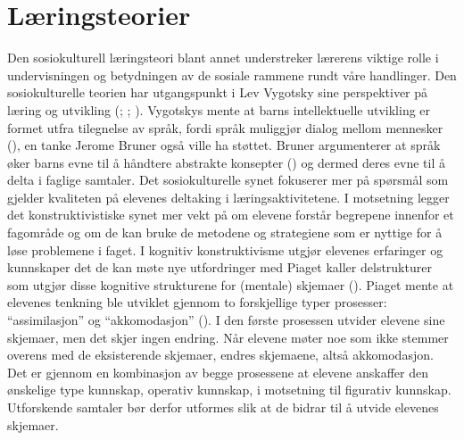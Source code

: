 \documentclass[12pt,twoside,onecolumn,norsk]{article}
\begin{document}
\section*{Læringsteorier}
Den sosiokulturell læringsteori blant annet understreker lærerens viktige 
rolle i undervisningen og betydningen av de sosiale rammene rundt våre 
handlinger. Den sosiokulturelle teorien har utgangspunkt i Lev Vygotsky 
sine perspektiver på læring og utvikling (; 
; ). Vygotskys
mente at barns intellektuelle utvikling er formet utfra tilegnelse av språk, 
fordi språk muliggjør dialog mellom mennesker (), 
en tanke Jerome Bruner også ville ha støttet. Bruner argumenterer at språk øker 
barns evne til å håndtere abstrakte konsepter () og dermed deres evne 
til å delta i faglige samtaler. Det sosiokulturelle synet fokuserer mer på 
spørsmål som gjelder kvaliteten på elevenes deltaking i læringsaktivitetene. I 
motsetning legger det konstruktivistiske synet mer vekt på om elevene forstår 
begrepene innenfor et fagområde og om de kan bruke de metodene og strategiene 
som er nyttige for å løse problemene i faget.
\newline
\newline
I kognitiv konstruktivisme utgjør elevenes erfaringer og kunnskaper det de 
kan møte nye utfordringer med Piaget kaller delstrukturer som utgjør disse 
kognitive strukturene for (mentale) skjemaer (). Piaget 
mente at elevenes tenkning ble utviklet gjennom to forskjellige typer 
prosesser: ``assimilasjon'' og ``akkomodasjon'' (). 
I den første prosessen utvider elevene sine skjemaer, men det skjer ingen 
endring. Når elevene møter noe som ikke stemmer overens med de eksisterende 
skjemaer, endres skjemaene, altså akkomodasjon. Det er gjennom en kombinasjon 
av begge prosessene at elevene anskaffer den ønskelige type kunnskap, 
operativ kunnskap, i motsetning til figurativ kunnskap. Utforskende samtaler 
bør derfor utformes slik at de bidrar til å utvide elevenes skjemaer.
\end{document}
